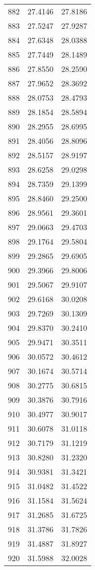 \documentclass{article}
\begin{document}
\begin{longtable}{|c|c|c|}
882 & 27.4146 & 27.8186 \\
883 & 27.5247 & 27.9287 \\
884 & 27.6348 & 28.0388 \\
885 & 27.7449 & 28.1489 \\
886 & 27.8550 & 28.2590 \\
887 & 27.9652 & 28.3692 \\
888 & 28.0753 & 28.4793 \\
889 & 28.1854 & 28.5894 \\
890 & 28.2955 & 28.6995 \\
891 & 28.4056 & 28.8096 \\
892 & 28.5157 & 28.9197 \\
893 & 28.6258 & 29.0298 \\
894 & 28.7359 & 29.1399 \\
895 & 28.8460 & 29.2500 \\
896 & 28.9561 & 29.3601 \\
897 & 29.0663 & 29.4703 \\
898 & 29.1764 & 29.5804 \\
899 & 29.2865 & 29.6905 \\
900 & 29.3966 & 29.8006 \\
901 & 29.5067 & 29.9107 \\
902 & 29.6168 & 30.0208 \\
903 & 29.7269 & 30.1309 \\
904 & 29.8370 & 30.2410 \\
905 & 29.9471 & 30.3511 \\
906 & 30.0572 & 30.4612 \\
907 & 30.1674 & 30.5714 \\
908 & 30.2775 & 30.6815 \\
909 & 30.3876 & 30.7916 \\
910 & 30.4977 & 30.9017 \\
911 & 30.6078 & 31.0118 \\
912 & 30.7179 & 31.1219 \\
913 & 30.8280 & 31.2320 \\
914 & 30.9381 & 31.3421 \\
915 & 31.0482 & 31.4522 \\
916 & 31.1584 & 31.5624 \\
917 & 31.2685 & 31.6725 \\
918 & 31.3786 & 31.7826 \\
919 & 31.4887 & 31.8927 \\
920 & 31.5988 & 32.0028 \\

\end{longtable}
\end{document}
